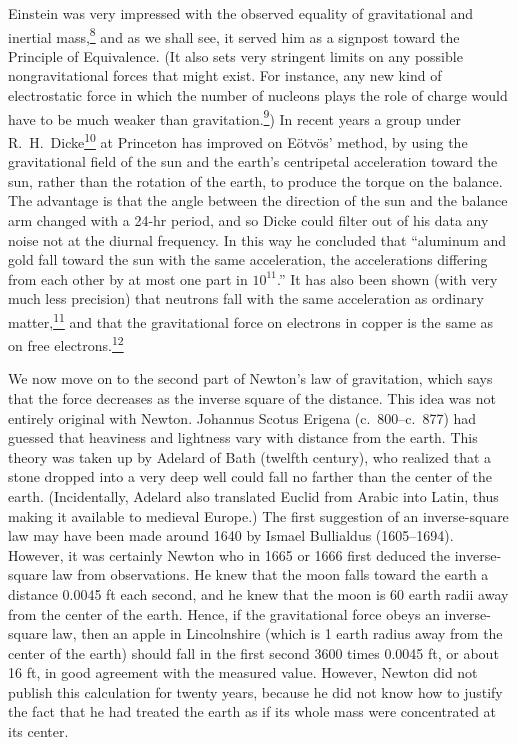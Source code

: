 Einstein was very impressed with the observed equality of gravitational and
inertial mass,\hyperref[ch1-ref-8]{\textsuperscript{8}} and as we shall see,
it served him as a signpost toward the Principle of Equivalence. (It also sets
very stringent limits on any possible nongravitational forces that might
exist. For instance, any new kind of electrostatic force in which the number
of nucleons plays the role of charge would have to be much weaker than
gravitation.\hyperref[ch1-ref-9]{\textsuperscript{9}}) In recent years a group
under R.\ H.\ Dicke\hyperref[ch1-ref-10]{\textsuperscript{10}} at Princeton
has improved on E\"otv\"os' method, by using the gravitational field of the sun
and the earth's centripetal acceleration toward the sun, rather than the
rotation of the earth, to produce the torque on the balance. The advantage is
that the angle between the direction of the sun and the balance arm changed
with a 24-hr period, and so Dicke could filter out of his data any noise not at
the diurnal frequency. In this way he concluded that ``aluminum and gold fall
toward the sun with the same acceleration, the accelerations differing from
each other by at most one part in \(10^{11}\).'' It has also been shown (with
very much less precision) that neutrons fall with the same acceleration as
ordinary matter,\hyperref[ch1-ref-11]{\textsuperscript{11}} and that the
gravitational force on electrons in copper is the same as on free
electrons.\hyperref[ch1-ref-12]{\textsuperscript{12}}

We now move on to the second part of Newton's law of gravitation, which says
that the force decreases as the inverse square of the distance. This idea was
not entirely original with Newton. Johannus Scotus Erigena
(c.\ 800--c.\ 877) had guessed that heaviness and lightness vary with distance
from the earth. This theory was taken up by Adelard of Bath (twelfth century),
who realized that a stone dropped into a very deep well could fall no farther
than the center of the earth. (Incidentally, Adelard also translated Euclid
from Arabic into Latin, thus making it available to medieval Europe.) The
first suggestion of an inverse-square law may have been made around 1640 by
Ismael Bullialdus (1605--1694). However, it was certainly Newton who in 1665
or 1666 first deduced the inverse-square law from observations. He knew that
the moon falls toward the earth a distance 0.0045 ft each second, and he knew
that the moon is 60 earth radii away from the center of the earth. Hence, if
the gravitational force obeys an inverse-square law, then an apple in
Lincolnshire (which is 1 earth radius away from the center of the earth)
should fall in the first second 3600 times 0.0045 ft, or about 16 ft, in good
agreement with the measured value. However, Newton did not publish this
calculation for twenty years, because he did not know how to justify the fact
that he had treated the earth as if its whole mass were concentrated at its
center.

